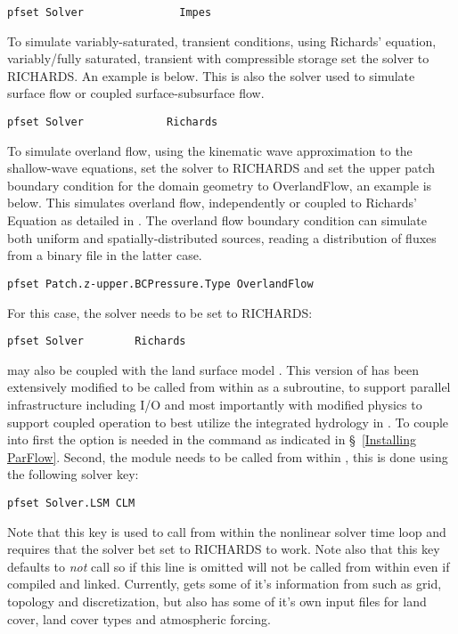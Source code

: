 \begin{verbatim}
pfset Solver               Impes
\end{verbatim}

To simulate variably-saturated, transient conditions, using Richards' equation, 
variably/fully saturated, transient with compressible storage set the solver to RICHARDS.  
An example is below.  This is also the solver used to simulate surface flow or coupled 
surface-subsurface flow.

\begin{verbatim}
pfset Solver             Richards
\end{verbatim}

To simulate overland flow, using the kinematic wave approximation to the shallow-wave 
equations, set the solver to RICHARDS and set the upper patch boundary condition for the 
domain geometry to OverlandFlow, an example is below.  This simulates overland flow, independently 
or coupled to Richards' Equation as detailed in \cite{KM06}.  The overland flow boundary 
condition can simulate both uniform and spatially-distributed sources, reading a distribution of
fluxes from a binary file in the latter case. 
\begin{verbatim}
pfset Patch.z-upper.BCPressure.Type	OverlandFlow
\end{verbatim}

For this case, the solver needs to be set to RICHARDS: 
\begin{verbatim}
pfset Solver		Richards
\end{verbatim}

\parflow{} may also be coupled with the land surface model  \cite{Dai03}.  
This version of  has been extensively modified to be called from within \parflow{} 
as a subroutine, to support parallel infrastructure including I/O and most importantly with modified 
physics to support coupled operation to best utilize the integrated hydrology
 in \parflow{} \cite{MM05, KM08a}.  To couple  into \parflow{} first the
  option is needed in the  command as indicated in \S~\ref{Installing ParFlow}. 
 Second, the  module needs to be called from within \parflow{}, this is done using the following 
 solver key:
\begin{verbatim}
pfset Solver.LSM CLM
\end{verbatim}
Note that this key is used to call  from within the nonlinear solver time loop 
and requires that the solver bet set to RICHARDS to work.  Note also that this key defaults to 
\emph{not} call  so if this line is omitted  will not be called from within 
\parflow{} even if compiled and linked.  Currently,  gets some of it's information from \parflow{} 
such as grid, topology and discretization, but also has some of it's own input files for land cover, land cover
types and atmospheric forcing.
